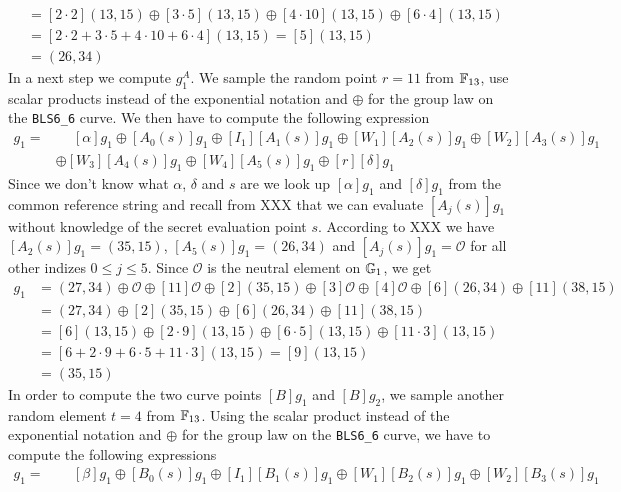 \begin{example}
\begin{align*}
      & = [2\cdot 2](13,15)\oplus [3\cdot 5](13,15)\oplus [4\cdot 10](13,15)\oplus [6\cdot 4](13,15) \\        
      & = [2\cdot 2+ 3\cdot 5+4\cdot 10+ 6\cdot 4](13,15) = [5](13,15)\\
      & = (26,34)
\end{align*} 
In a next step we compute $g_1^A$. We sample the random point $r=11$ from $\mathbb{F}_{13}$, use scalar products instead of the exponential notation and $\oplus$ for the group law on the \texttt{BLS6\_6} curve. We then have to compute the following expression
\begin{align*}
[A]g_1 = &\phantom{\oplus} [\alpha]g_1 \oplus [A_0(s)]g_1 \oplus [I_1][A_1(s)]g_1\oplus [W_1][A_2(s)]g_1 \oplus [W_2][A_3(s)]g_1\\ 
       & \oplus [W_3][A_4(s)]g_1\oplus [W_4][A_5(s)]g_1\oplus [r][\delta]g_1
\end{align*}
Since we don't know what $\alpha$, $\delta$ and $s$ are we look up $[\alpha]g_1$ and $[\delta]g_1$ from the common reference string and recall from XXX that we can evaluate $[A_j(s)]g_1$ without knowledge of the secret evaluation point $s$. According to XXX we have $[A_2(s)]g_1=(35,15)$, $[A_5(s)]g_1=(26,34)$ and $[A_j(s)]g_1=\mathcal{O}$ for all other indizes $0\leq j\leq 5$. Since $\mathcal{O}$ is the neutral element on $\mathbb{G}_1$, we get  
\begin{align*}
[A]g_1 &= (27,34) \oplus \mathcal{O} \oplus [11]\mathcal{O}\oplus [2](35,15) \oplus [3]\mathcal{O} \oplus [4]\mathcal{O}\oplus [6](26,34)\oplus [11](38,15)\\
 &=  (27,34)\oplus [2](35,15)\oplus [6](26,34)\oplus [11](38,15)\\
 &=  [6](13,15)\oplus [2\cdot 9](13,15)\oplus [6\cdot 5](13,15)\oplus [11\cdot 3](13,15)\\ 
 &=  [6+ 2\cdot 9+ 6\cdot 5+ 11\cdot 3](13,15) = [9](13,15)\\
 &= (35,15)
\end{align*}
In order to compute the two curve points $[B]g_1$ and $[B]g_2$, we sample another random element $t=4$ from $\mathbb{F}_{13}$. Using the scalar product instead of the exponential notation and $\oplus$ for the group law on the \texttt{BLS6\_6} curve, we  have to compute the following expressions
\begin{align*}
[B]g_1 = &\phantom{\oplus} [\beta]g_1 \oplus [B_0(s)]g_1 \oplus [I_1][B_1(s)]g_1\oplus [W_1][B_2(s)]g_1 \oplus [W_2][B_3(s)]g_1\\ 

\end{align*}
\end{example}
